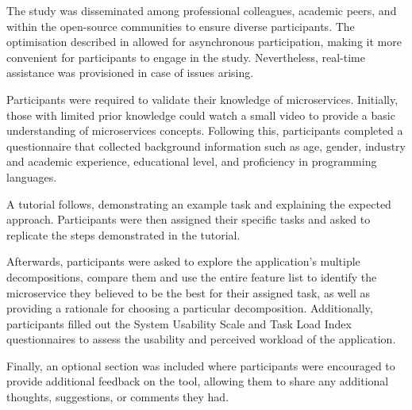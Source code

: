 The study was disseminated among professional colleagues, academic peers, and
within the open-source communities to ensure diverse participants. The
optimisation described in  allowed for asynchronous
participation, making it more convenient for participants to engage in the
study. Nevertheless, real-time assistance was provisioned in case of issues
arising.

Participants were required to validate their knowledge of microservices.
Initially, those with limited prior knowledge could watch a small video to
provide a basic understanding of microservices concepts. Following this,
participants completed a questionnaire that collected background information
such as age, gender, industry and academic experience, educational level, and
proficiency in programming languages.

A tutorial follows, demonstrating an example task and explaining the expected
approach. Participants were then assigned their specific tasks and asked to
replicate the steps demonstrated in the tutorial.

Afterwards, participants were asked to explore the application's multiple
decompositions, compare them and use the entire feature list to identify the
microservice they believed to be the best for their assigned task, as well as
providing a rationale for choosing a particular decomposition. Additionally,
participants filled out the System Usability Scale and Task Load Index
questionnaires to assess the usability and perceived workload of the
application.

Finally, an optional section was included where participants were encouraged to
provide additional feedback on the tool, allowing them to share any additional
thoughts, suggestions, or comments they had.
